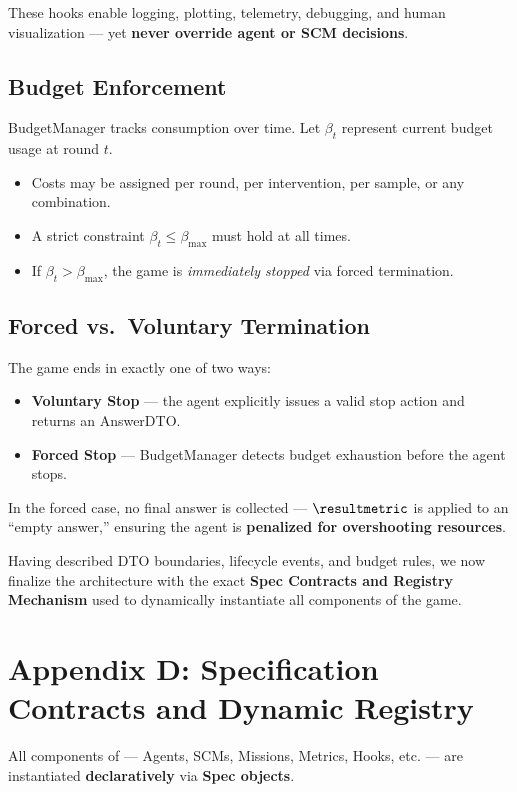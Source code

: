 These hooks enable logging, plotting, telemetry, debugging, and human visualization — yet \textbf{never override agent or SCM decisions}.

\subsection{Budget Enforcement}
BudgetManager tracks consumption over time. Let $\beta_t$ represent current budget usage at round $t$.

\begin{itemize}
    \item Costs may be assigned per round, per intervention, per sample, or any combination.
    \item A strict constraint $\beta_t \leq \beta_{\max}$ must hold at all times.
    \item If $\beta_t > \beta_{\max}$, the game is \emph{immediately stopped} via forced termination.
\end{itemize}

\subsection{Forced vs.\ Voluntary Termination}
The game ends in exactly one of two ways:
\begin{itemize}
    \item \textbf{Voluntary Stop} — the agent explicitly issues a valid stop action and returns an AnswerDTO.
    \item \textbf{Forced Stop} — BudgetManager detects budget exhaustion before the agent stops.
\end{itemize}

In the forced case, no final answer is collected — $\resultmetric$ is applied to an “empty answer,” ensuring the agent is \textbf{penalized for overshooting resources}.

\bigskip
Having described DTO boundaries, lifecycle events, and budget rules, we now finalize the architecture with the exact \textbf{Spec Contracts and Registry Mechanism} used to dynamically instantiate all components of the game.


\section{Appendix D: Specification Contracts and Dynamic Registry}
\label{appendix:specs_registry}

All components of \game — Agents, SCMs, Missions, Metrics, Hooks, etc. — are instantiated \textbf{declaratively} via \textbf{Spec objects}.


